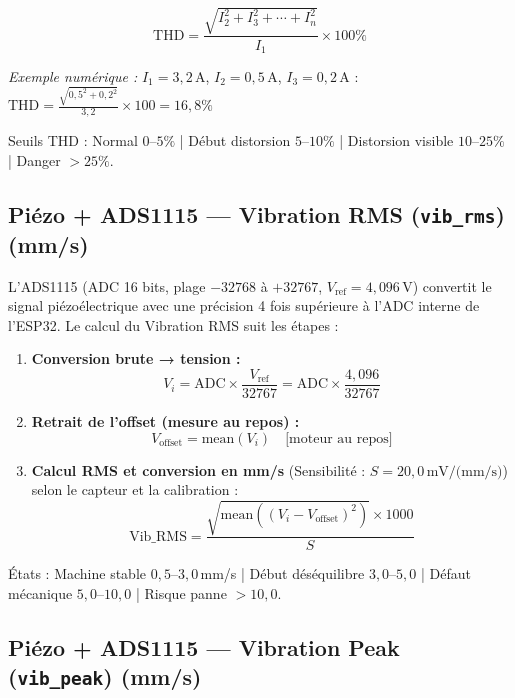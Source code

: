 \documentclass[12pt, a4paper, oneside]{report}
\begin{document}
\begin{equation}
  \text{THD} = \frac{\sqrt{I_2^2 + I_3^2 + \cdots + I_n^2}}{I_1} \times 100\%
\end{equation}

\noindent\textit{Exemple numérique :} $I_1 = 3{,}2\,\text{A}$, $I_2 = 0{,}5\,\text{A}$, $I_3 = 0{,}2\,\text{A}$ :
$\text{THD} = \frac{\sqrt{0{,}5^2 + 0{,}2^2}}{3{,}2} \times 100 = 16{,}8\%$

Seuils THD : Normal $0$--$5\%$ | Début distorsion $5$--$10\%$ | Distorsion visible $10$--$25\%$ | Danger $> 25\%$.

\subsection{Piézo + ADS1115 — Vibration RMS (\texttt{vib\_rms}) (mm/s)}

L'ADS1115 \cite{ads1115} (ADC 16 bits, plage $-32768$ à $+32767$, $V_{\text{ref}} = 4{,}096\,\text{V}$)
convertit le signal piézoélectrique avec une précision 4 fois supérieure à l'ADC interne de
l'ESP32. Le calcul du Vibration RMS suit les étapes :

\begin{enumerate}
  \item \textbf{Conversion brute → tension :}
  \begin{equation}
    V_i = \text{ADC} \times \frac{V_{\text{ref}}}{32767} = \text{ADC} \times \frac{4{,}096}{32767}
  \end{equation}

  \item \textbf{Retrait de l'offset (mesure au repos) :}
  \begin{equation}
    V_{\text{offset}} = \text{mean}(V_i) \quad \text{[moteur au repos]}
  \end{equation}

  \item \textbf{Calcul RMS et conversion en mm/s} (Sensibilité : $S = 20{,}0\,\text{mV/(mm/s)}$) selon le capteur et la calibration :
  \begin{equation}
    \text{Vib\_RMS} = \frac{\sqrt{\text{mean}((V_i - V_{\text{offset}})^2)} \times 1000}{S}
  \end{equation}
\end{enumerate}

États : Machine stable $0{,}5$--$3{,}0$\,mm/s | Début déséquilibre $3{,}0$--$5{,}0$ | Défaut mécanique $5{,}0$--$10{,}0$ | Risque panne $> 10{,}0$.

\subsection{Piézo + ADS1115 — Vibration Peak (\texttt{vib\_peak}) (mm/s)}
\end{document}
